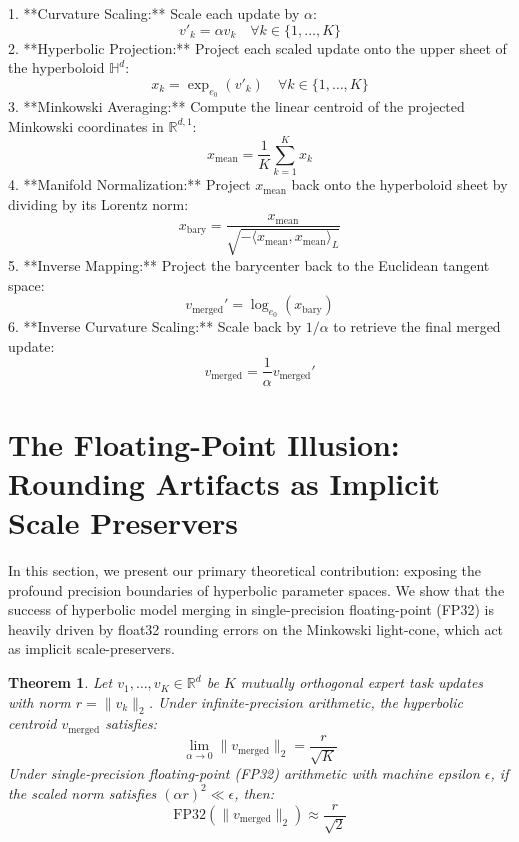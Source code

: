 \documentclass{article}
\theoremstyle{plain}
\newtheorem{theorem}{Theorem}[section]
\theoremstyle{definition}
\theoremstyle{remark}
\begin{document}
1. **Curvature Scaling:** Scale each update by $\alpha$:
   \begin{equation}
   v'_k = \alpha v_k \quad \forall k \in \{1, \dots, K\}
   \end{equation}
2. **Hyperbolic Projection:** Project each scaled update onto the upper sheet of the hyperboloid $\mathbb{H}^d$:
   \begin{equation}
   x_k = \exp_{e_0}(v'_k) \quad \forall k \in \{1, \dots, K\}
   \end{equation}
3. **Minkowski Averaging:** Compute the linear centroid of the projected Minkowski coordinates in $\mathbb{R}^{d, 1}$:
   \begin{equation}
   x_{\text{mean}} = \frac{1}{K} \sum_{k=1}^K x_k
   \end{equation}
4. **Manifold Normalization:** Project $x_{\text{mean}}$ back onto the hyperboloid sheet by dividing by its Lorentz norm:
   \begin{equation}
   x_{\text{bary}} = \frac{x_{\text{mean}}}{\sqrt{-\langle x_{\text{mean}}, x_{\text{mean}} \rangle_L}}
   \end{equation}
5. **Inverse Mapping:** Project the barycenter back to the Euclidean tangent space:
   \begin{equation}
   v_{\text{merged}}' = \log_{e_0}(x_{\text{bary}})
   \end{equation}
6. **Inverse Curvature Scaling:** Scale back by $1/\alpha$ to retrieve the final merged update:
   \begin{equation}
   v_{\text{merged}} = \frac{1}{\alpha} v_{\text{merged}}'
   \end{equation}

\section{The Floating-Point Illusion: Rounding Artifacts as Implicit Scale Preservers}
\label{sec:illusion}
In this section, we present our primary theoretical contribution: exposing the profound precision boundaries of hyperbolic parameter spaces. We show that the success of hyperbolic model merging in single-precision floating-point (FP32) is heavily driven by float32 rounding errors on the Minkowski light-cone, which act as implicit scale-preservers.

\begin{theorem}
Let $v_1, \dots, v_K \in \mathbb{R}^d$ be $K$ mutually orthogonal expert task updates with norm $r = \|v_k\|_2$. Under infinite-precision arithmetic, the hyperbolic centroid $v_{\text{merged}}$ satisfies:
\begin{equation}
\lim_{\alpha \to 0} \|v_{\text{merged}}\|_2 = \frac{r}{\sqrt{K}}
\end{equation}
Under single-precision floating-point (FP32) arithmetic with machine epsilon $\epsilon$, if the scaled norm satisfies $(\alpha r)^2 \ll \epsilon$, then:
\begin{equation}
\text{FP32}(\|v_{\text{merged}}\|_2) \approx \frac{r}{\sqrt{2}}
\end{equation}
\end{theorem}
\end{document}
